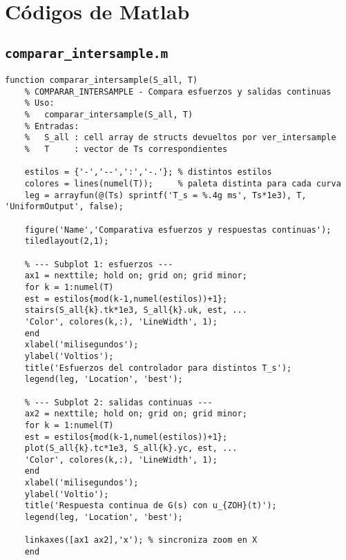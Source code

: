 \onecolumn
\appendices
\section{Códigos de Matlab}


\subsection{\texttt{comparar\_intersample.m}}
\begin{lstlisting}[style=matlabstyle,caption={Comparación inter-muestra.}]
	function comparar_intersample(S_all, T)
	% COMPARAR_INTERSAMPLE - Compara esfuerzos y salidas continuas
	% Uso:
	%   comparar_intersample(S_all, T)
	% Entradas:
	%   S_all : cell array de structs devueltos por ver_intersample
	%   T     : vector de Ts correspondientes
	
	estilos = {'-','--',':','-.'}; % distintos estilos
	colores = lines(numel(T));     % paleta distinta para cada curva
	leg = arrayfun(@(Ts) sprintf('T_s = %.4g ms', Ts*1e3), T, 'UniformOutput', false);
	
	figure('Name','Comparativa esfuerzos y respuestas continuas');
	tiledlayout(2,1);
	
	% --- Subplot 1: esfuerzos ---
	ax1 = nexttile; hold on; grid on; grid minor;
	for k = 1:numel(T)
	est = estilos{mod(k-1,numel(estilos))+1};
	stairs(S_all{k}.tk*1e3, S_all{k}.uk, est, ...
	'Color', colores(k,:), 'LineWidth', 1);
	end
	xlabel('milisegundos');
	ylabel('Voltios');
	title('Esfuerzos del controlador para distintos T_s');
	legend(leg, 'Location', 'best');
	
	% --- Subplot 2: salidas continuas ---
	ax2 = nexttile; hold on; grid on; grid minor;
	for k = 1:numel(T)
	est = estilos{mod(k-1,numel(estilos))+1};
	plot(S_all{k}.tc*1e3, S_all{k}.yc, est, ...
	'Color', colores(k,:), 'LineWidth', 1);
	end
	xlabel('milisegundos');
	ylabel('Voltio');
	title('Respuesta continua de G(s) con u_{ZOH}(t)');
	legend(leg, 'Location', 'best');
	
	linkaxes([ax1 ax2],'x'); % sincroniza zoom en X
	end
\end{lstlisting}

